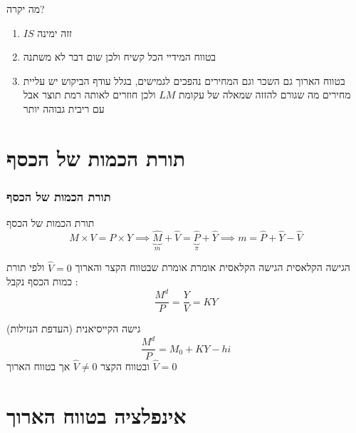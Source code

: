 \documentclass[usenames,dvipsnames]{beamer}
\begin{document}
\begin{RTL}
\begin{frame}[allowframebreaks]
\begin{center}
\begin{tikzpicture}[scale=1.3, thick, dot/.style={circle,inner sep=1pt,fill,name=#1}]
          
          \end{tikzpicture}
    \end{center}
    \framebreak
    \begin{block}{מה יקרה?}
        \begin{enumerate}
            \item $IS$ זזה ימינה
            \item בטווח המידיי הכל קשיח ולכן שום דבר לא משתנה
            \item בטווח הארוך גם השכר וגם המחירים נהפכים לגמישים, בגלל עודף הביקוש יש עליית מחירים מה שגורם להזזה שמאלה של עקומת $LM$ ולכן חוזרים לאותה רמת תוצר אבל עם ריבית גבוהה יותר
        \end{enumerate}
    \end{block}

\end{frame}

\section{תורת הכמות של הכסף}
\begin{frame}[allowframebreaks]
    \frametitle{תורת הכמות של הכסף}
    \begin{block}{תורת הכמות של הכסף}
        $$M \times V = P \times Y \implies \underbrace{\widehat{M}}_{m} + \widehat{V} = \underbrace{\widehat{P}}_{\pi} + \widehat{Y} \implies  m = \widehat{P} + \widehat{Y} - \widehat{V}$$
    \end{block}
    
    \begin{block}{הגישה הקלאסית}
        הגישה הקלאסית אומרת אומרת שבטווח הקצר והארוך $\widehat{V} = 0$ ולפי תורת כמות הכסף נקבל :
        $$\frac{M^d}{P} = \frac{Y}{V} = KY$$
    \end{block}

    \begin{block}{גישה הקייסיאנית (העדפת הנזילות)}
        $$\frac{M^d}{P} = M_0 + KY - hi$$
        ובטווח הקצר $\widehat{V} \neq 0$ אך בטווח הארוך $\widehat{V} = 0$
    \end{block}

\end{frame}


\section{אינפלציה בטווח הארוך}


\end{RTL}
\end{document}
